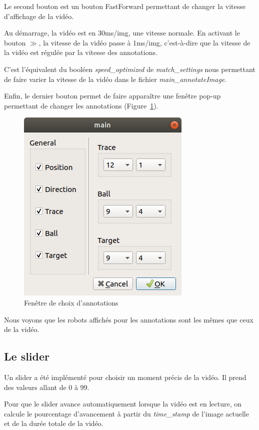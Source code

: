Le second bouton est un bouton FastForward permettant de changer
la vitesse d'affichage de la vidéo.

Au démarrage, la vidéo est en 30ms/img, une vitesse normale. En
activant le bouton $\gg$, la vitesse de la vidéo passe à 1ms/img,
c'est-à-dire que la vitesse de la vidéo est régulée par la
vitesse des annotations.

C'est l'équivalent du booléen \textit{speed\_optimized} de
\textit{match\_settings} nous permettant de faire varier la
vitesse de la vidéo dans le fichier \textit{main\_annotateImage}.
\bigskip

Enfin, le dernier bouton permet de faire apparaître une fenêtre
pop-up permettant de changer les annotations 
(Figure~\ref{fig:annot}).

\begin{figure}[h] 
\centering 
\includegraphics[scale = 0.35]{images/annotationchoice.png}
\caption{Fenêtre de choix d'annotations}
\label{fig:annot}
\end{figure}

Nous voyons que les robots affichés pour les annotations sont les
mêmes que ceux de la vidéo.

\subsection{Le slider} \label{slider}

Un slider a été implémenté pour choisir un moment précis de la
vidéo. Il prend des valeurs allant de 0 à 99. 
\bigskip

Pour que le slider avance automatiquement lorsque la vidéo est en
lecture, on calcule le pourcentage d'avancement à partir du
\textit{time\_stamp} de l'image actuelle et de la durée totale de
la vidéo.
\bigskip

